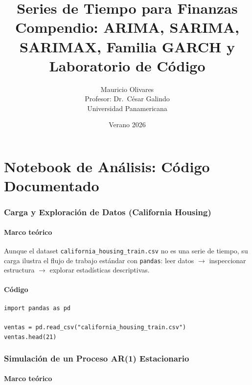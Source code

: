 \documentclass[12pt,letterpaper]{article}
\title{
  \LARGE\bfseries Series de Tiempo para Finanzas\\[0.5em]
  \large Compendio: ARIMA, SARIMA, SARIMAX, Familia GARCH y Laboratorio de C\'odigo
}
\author{
  Mauricio Olivares\\[0.3em]
  \small Profesor: Dr.\ C\'esar Galindo\\
  \small Universidad Panamericana
}
\date{Verano 2026}
\begin{document}
\maketitle
\thispagestyle{empty}
\tableofcontents
\newpage

\part{Notebook de An\'alisis: C\'odigo Documentado}

\section{Carga y Exploraci\'on de Datos (California Housing)}

\subsection{Marco te\'orico}

Aunque el dataset \texttt{california\_housing\_train.csv} no es una serie de tiempo,
su carga ilustra el flujo de trabajo est\'andar con \texttt{pandas}:
leer datos $\to$ inspeccionar estructura $\to$ explorar estad\'isticas descriptivas.

\subsection{C\'odigo}

\begin{lstlisting}[style=python, caption={Carga del dataset California Housing}]
import pandas as pd

ventas = pd.read_csv("california_housing_train.csv")
ventas.head(21)
\end{lstlisting}

\section{Simulaci\'on de un Proceso AR(1) Estacionario}

\subsection{Marco te\'orico}
\end{document}
